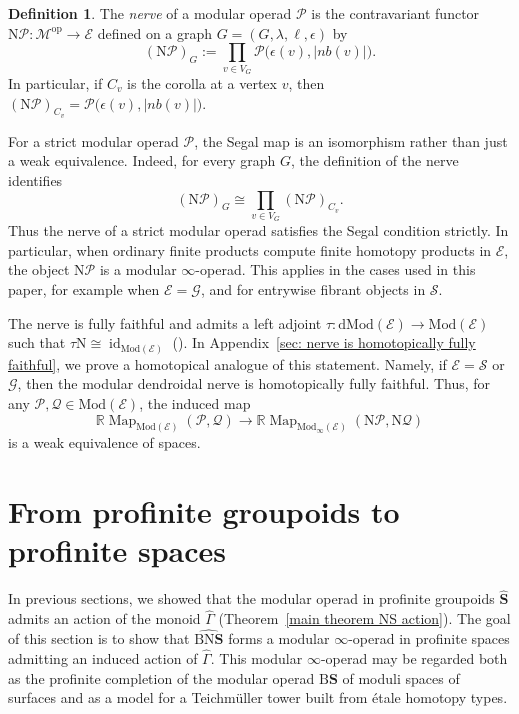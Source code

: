 \documentclass{amsart}
\newcommand{\bE}{\mathscr{E}}
\newcommand{\bM}{\mathscr{M}}
\newcommand{\calQ}{\mathcal{Q}}
\newcommand{\bS}{\mathbf{S}}
\newcommand{\sSet}{\mathscr{S}}
\newcommand{\Grpd}{\mathscr{G}}
\newcommand{\calP}{\mathcal{P}}
\newcommand{\Mod}{\mathrm{Mod}}
\newcommand{\dMod}{\mathrm{dMod}}
\newcommand{\id}{\operatorname{id}}
\newcommand{\cs}{\mathrm{B}}
\newcommand{\nerve}{\mathrm{N}}
\newcommand{\Map}{\operatorname{Map}}
\newcommand{\NS}{\widehat{\mathsf{\Gamma}}}
\newcommand{\nb}{nb}
\theoremstyle{definition}
\newtheorem{definition}[theorem]{Definition}%
\numberwithin{equation}{section}
\begin{document}
\begin{definition}\label{def: modular nerve}
The \emph{nerve} of a modular operad $\calP$ is the contravariant functor $\nerve\calP:\bM^{\mathrm{op}}\to\bE$ defined on a graph $G=(G,\lambda,\ell,\epsilon)$ by
\[
(\nerve\calP)_G := \prod_{v\in V_G} \calP\bigl(\epsilon(v),|\nb(v)|\bigr).
\]
In particular, if $C_v$ is the corolla at a vertex $v$, then $(\nerve\calP)_{C_v}=\calP\bigl(\epsilon(v),|\nb(v)|\bigr).$
\end{definition}

For a strict modular operad $\calP$, the Segal map is an isomorphism rather than just a weak equivalence. Indeed, for every graph $G$, the definition of the nerve identifies \[ (\nerve\calP)_G \cong \prod_{v\in V_G}(\nerve\calP)_{C_v}. \] Thus the nerve of a strict modular operad satisfies the Segal condition strictly. In particular, when ordinary finite products compute finite homotopy products in $\bE$, the object $\nerve\calP$ is a modular $\infty$-operad. This applies in the cases used in this paper, for example when $\bE=\Grpd$, and for entrywise fibrant objects in $\sSet$.


The nerve is fully faithful and admits a left adjoint $\tau:\dMod(\bE)\longrightarrow \Mod(\bE)$ such that $\tau\nerve\cong \id_{\Mod(\bE)}$ (\cite[Theorem~3.6]{hry_modular_nerve}). In Appendix~\ref{sec: nerve is homotopically fully faithful}, we prove a homotopical analogue of this statement. Namely, if $\bE=\sSet$ or $\Grpd$, then the modular dendroidal nerve is homotopically fully faithful. Thus, for any $\calP,\calQ\in\Mod(\bE)$, the induced map
\[ \mathbb{R}\Map_{\Mod(\bE)}(\calP,\calQ) \longrightarrow \mathbb{R}\Map_{\Mod_{\infty}(\bE)}(\nerve\calP,\nerve\calQ) \] is a weak equivalence of spaces.
\section{From profinite groupoids to profinite spaces}\label{sec: homotopy action} 
In previous sections, we showed that the modular operad in profinite groupoids $\widehat{\bS}$ admits an action of the monoid ${\NS}$ (Theorem~\ref{main theorem NS action}). The goal of this section is to show that $\widehat{\cs\nerve\bS}$ forms a modular $\infty$-operad in profinite spaces admitting an induced action of ${\NS}$. This modular $\infty$-operad may be regarded both as the profinite completion of the modular operad $\cs\bS$ of moduli spaces of surfaces and as a model for a Teichmüller tower built from étale homotopy types.
\end{document}
